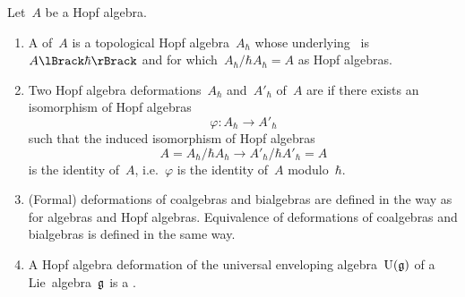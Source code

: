 \documentclass[a4paper, 11pt, oneside]{scrartcl}
\begin{document}
\begin{definition}
  Let~$A$ be a Hopf algebra.
  \begin{enumerate}
    \item
      A  of~$A$ is a topological Hopf algebra~$A_{\hbar}$ whose underlying~\module{$\kfhbar$} is~$\power{A}{\hbar}$ and for which~$A_\hbar / \hbar A_\hbar = A$ as Hopf algebras.
    \item
      Two Hopf algebra deformations~$A_\hbar$ and~$A'_\hbar$ of~$A$ are  if there exists an isomorphism of Hopf algebras
      \[
        \varphi
        \colon
        A_\hbar
        \to
        A'_\hbar
      \]
      such that the induced isomorphism of Hopf algebras
      \[
        A
        =
        A_\hbar / \hbar A_\hbar
        \to
        A'_\hbar / \hbar A'_\hbar
        = A
      \]
      is the identity of~$A$, i.e.~$\varphi$ is the identity of~$A$ modulo~$\hbar$.
    \item
      (Formal) deformations of coalgebras and bialgebras are defined in the way as for algebras and Hopf algebras.
      Equivalence of deformations of coalgebras and bialgebras is defined in the same way.
    \item
      A Hopf algebra deformation of the universal enveloping algebra~$\operatorname{U}(\mathfrak{g})$ of a Lie~algebra~$\mathfrak{g}$ is a .
  \end{enumerate}
\end{definition}
\end{document}
